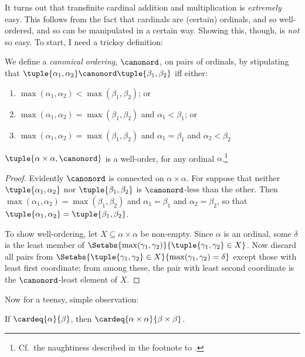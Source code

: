 \documentclass[../../../include/open-logic-section]{subfiles}
\begin{document}
It turns out that transfinite cardinal addition and multiplication is \emph{extremely} easy. This follows from the fact that cardinals are (certain) ordinals, and so well-ordered, and so can be manipulated in a certain way. Showing this, though, is \emph{not} so easy. To start, I need a tricksy definition:
\begin{defn}
	We define a \emph{canonical ordering}, $\canonord$, on pairs of ordinals, by stipulating that $\tuple{\alpha_1, \alpha_2} \canonord \tuple{\beta_1, \beta_2}$ iff either:
	\begin{enumerate}
		\item $\max(\alpha_1, \alpha_2) < \max(\beta_1, \beta_2)$; or
		\item $\max(\alpha_1, \alpha_2) = \max(\beta_1, \beta_2)$ and $\alpha_1 < \beta_1$; or
		\item $\max(\alpha_1, \alpha_2) = \max(\beta_1, \beta_2)$ and $\alpha_1 = \beta_1$ and $\alpha_2 < \beta_2$
	\end{enumerate}
\end{defn}
\begin{lem}$\tuple{\alpha \times \alpha, \canonord}$ is a well-order, for any ordinal $\alpha$.\footnote{Cf.\ the naughtiness described in the footnote to .}
\end{lem}
\begin{proof}
	Evidently $\canonord$ is connected on $\alpha \times \alpha$. For suppose that neither $\tuple{\alpha_1, \alpha_2}$ nor $\tuple{\beta_1,  \beta_2}$ is $\canonord$-less than the other. Then $\max(\alpha_1, \alpha_2) = \max(\beta_1, \beta_2)$ and $\alpha_1 = \beta_1$ and $\alpha_2 = \beta_2$, so that $\tuple{\alpha_1, \alpha_2} = \tuple{\beta_1,  \beta_2}$.
	
	To show well-ordering, let $X \subseteq \alpha\times\alpha$ be non-empty. Since $\alpha$ is an ordinal, some $\delta$ is the least member of $\Setabs{\max(\gamma_1, \gamma_2)}{\tuple{\gamma_1, \gamma_2} \in X}$. Now discard all pairs from $\Setabs{\tuple{\gamma_1,\gamma_2} \in X}{\max(\gamma_1, \gamma_2) = \delta}$ except those with least first coordinate; from among these, the pair with least second coordinate is the $\canonord$-least element of $X$.
\end{proof}\noindent
Now for a teensy, simple observation:
\begin{prop}
	If $\cardeq{\alpha}{\beta}$, then $\cardeq{\alpha \times \alpha}{\beta \times \beta}$. 
\end{prop}
\end{document}
